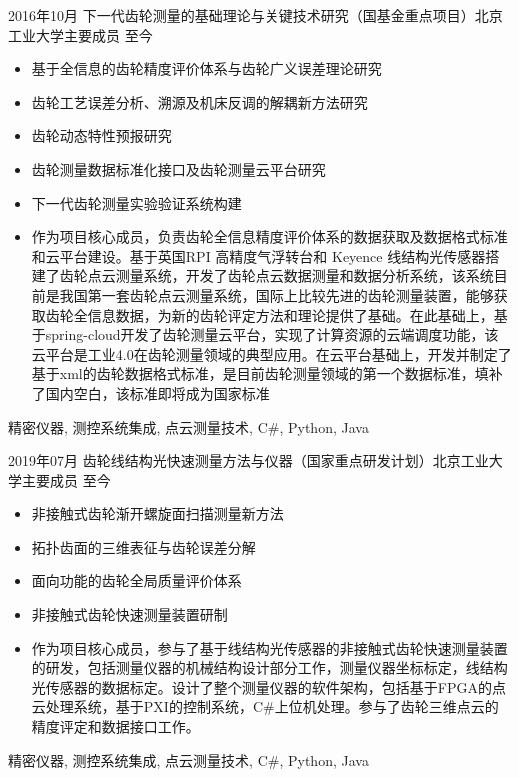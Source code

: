 %
%



\begin{experiences}

  \experience
  {2016年10月}   {下一代齿轮测量的基础理论与关键技术研究（国基金重点项目）}{北京工业大学}{主要成员}
  {至今} {
    \begin{itemize}
      \item 基于全信息的齿轮精度评价体系与齿轮广义误差理论研究
      \item 齿轮工艺误差分析、溯源及机床反调的解耦新方法研究
      \item 齿轮动态特性预报研究
      \item 齿轮测量数据标准化接口及齿轮测量云平台研究
      \item 下一代齿轮测量实验验证系统构建
      \item 作为项目核心成员，负责齿轮全信息精度评价体系的数据获取及数据格式标准和云平台建设。基于英国RPI 高精度气浮转台和 Keyence 线结构光传感器搭建了齿轮点云测量系统，开发了齿轮点云数据测量和数据分析系统，该系统目前是我国第一套齿轮点云测量系统，国际上比较先进的齿轮测量装置，能够获取齿轮全信息数据，为新的齿轮评定方法和理论提供了基础。在此基础上，基于spring-cloud开发了齿轮测量云平台，实现了计算资源的云端调度功能，该云平台是工业4.0在齿轮测量领域的典型应用。在云平台基础上，开发并制定了基于xml的齿轮数据格式标准，是目前齿轮测量领域的第一个数据标准，填补了国内空白，该标准即将成为国家标准
    \end{itemize}
  }
  {精密仪器, 测控系统集成, 点云测量技术, C\#, Python, Java}
  \emptySeparator

  \experience
  {2019年07月}   {齿轮线结构光快速测量方法与仪器（国家重点研发计划）}{北京工业大学}{主要成员}
  {至今} {
    \begin{itemize}
      \item 非接触式齿轮渐开螺旋面扫描测量新方法
      \item 拓扑齿面的三维表征与齿轮误差分解
      \item 面向功能的齿轮全局质量评价体系
      \item 非接触式齿轮快速测量装置研制
      \item 作为项目核心成员，参与了基于线结构光传感器的非接触式齿轮快速测量装置的研发，包括测量仪器的机械结构设计部分工作，测量仪器坐标标定，线结构光传感器的数据标定。设计了整个测量仪器的软件架构，包括基于FPGA的点云处理系统，基于PXI的控制系统，C\#上位机处理。参与了齿轮三维点云的精度评定和数据接口工作。
    \end{itemize}
  }
  {精密仪器, 测控系统集成, 点云测量技术, C\#, Python, Java}
  \emptySeparator


\end{experiences}
